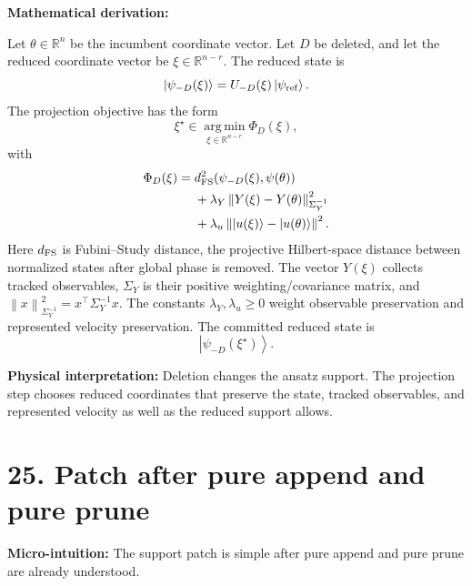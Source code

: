 \documentclass[10pt,twocolumn]{article}
\newcommand{\ket}[1]{\left|#1\right\rangle}
\newcommand{\norm}[1]{\left\lVert #1\right\rVert}
\newcommand{\R}{\mathbb R}
\newcommand{\argmin}{\operatorname*{arg\,min}}
\newcommand{\micro}[1]{%
  \par\smallskip
  \noindent\textcolor{deepblue}{\textbf{Micro-intuition:}} #1
  \par\smallskip}
\newcommand{\deriv}{%
  \par\noindent\textcolor{deepviolet}{\textbf{Mathematical derivation:}}\par\vspace{-1mm}}
\newcommand{\phys}[1]{%
  \par\smallskip
  \noindent\textcolor{deepgreen}{\textbf{Physical interpretation:}} #1
  \par\smallskip}
\begin{document}
\deriv
Let \(\theta\in\R^n\) be the incumbent coordinate vector. Let \(D\) be deleted,
and let the reduced coordinate vector be \(\xi\in\R^{n-r}\). The reduced state is
\[
\ket{\psi_{-D}(\xi)}=U_{-D}(\xi)\ket{\psi_{\rm ref}}.
\]
The projection objective has the form
\[
\xi^\star\in\argmin_{\xi\in\R^{n-r}}
\Phi_D(\xi),
\]
with
\[
\begin{aligned}
\Phi_D(\xi)
={}&
d_{\rm FS}^2(\psi_{-D}(\xi),\psi(\theta))\\
&+\lambda_Y\norm{Y(\xi)-Y(\theta)}_{\Sigma_Y^{-1}}^2\\
&+\lambda_u\norm{\ket{u(\xi)}-\ket{u(\theta)}}^2.
\end{aligned}
\]
Here \(d_{\rm FS}\) is Fubini--Study distance, the projective Hilbert-space
distance between normalized states after global phase is removed. The vector
\(Y(\xi)\) collects tracked observables, \(\Sigma_Y\) is their positive
weighting/covariance matrix, and
\(\norm{x}_{\Sigma_Y^{-1}}^2=x^\top\Sigma_Y^{-1}x\). The constants
\(\lambda_Y,\lambda_u\ge0\) weight observable preservation and represented
velocity preservation.
The committed reduced state is
\[
\ket{\psi_{-D}(\xi^\star)}.
\]

\phys{Deletion changes the ansatz support. The projection step chooses reduced
coordinates that preserve the state, tracked observables, and represented
velocity as well as the reduced support allows.}

\section*{25. Patch after pure append and pure prune}

\micro{The support patch is simple after pure append and pure prune are already
understood.}
\end{document}
